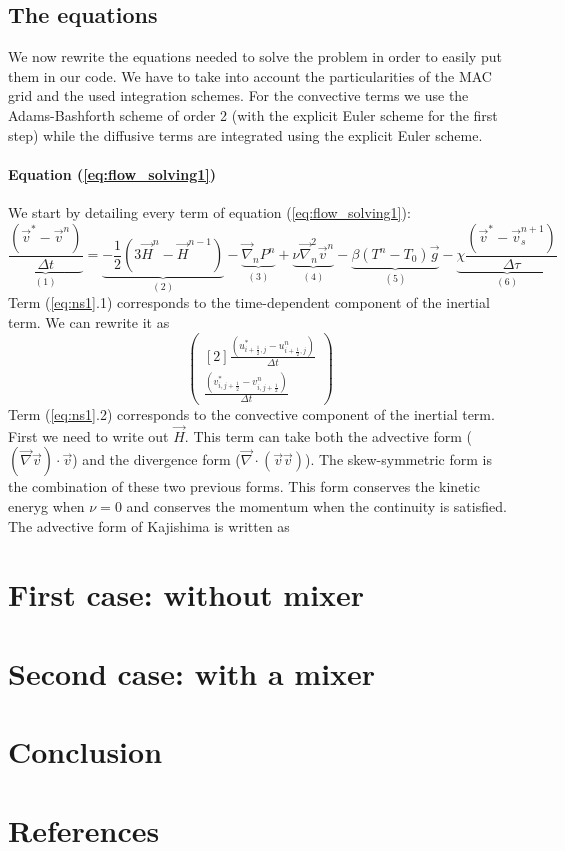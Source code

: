 \documentclass[a4paper,10pt]{scrartcl}
\newcommand\lapl{\vec{\nabla}^2}
\newcommand\grad{\vec{\nabla}}
\begin{document}
\subsection{The equations}
We now rewrite the equations needed to solve the problem in order to easily put them in our code. We have to take into account the particularities of the MAC grid and the used integration schemes. For the convective terms we use the Adams-Bashforth scheme of order 2 (with the explicit Euler scheme for the first step) while the diffusive terms are integrated using the explicit Euler scheme.
\paragraph{Equation (\ref{eq:flow_solving1})}
We start by detailing every term of equation (\ref{eq:flow_solving1}):
\begin{equation} \underbrace{\frac{(\vec{v}^*-\vec{v}^n)}{\Delta t}}_{(1)} = \underbrace{-\frac{1}{2}(3\vec{H}^n-\vec{H}^{n-1})}_{(2)} - \underbrace{\grad_nP^n}_{(3)} + \underbrace{\nu\lapl_n\vec{v}^n}_{(4)} - \underbrace{\beta(T^n-T_0)\vec{g}}_{(5)} - \underbrace{\chi\frac{(\vec{v}^*-\vec{v}_s^{n+1})}{\Delta\tau}}_{(6)} \label{eq:ns1}\end{equation}
Term (\ref{eq:ns1}.1) corresponds to the time-dependent component of the inertial term. We can rewrite it as
\begin{equation} \begin{pmatrix}[2] \frac{(u^*_{i+\frac{1}{2},j} - u^n_{i+\frac{1}{2},j})}{\Delta t} \\ \frac{(v^*_{i,j+\frac{1}{2}} - v^n_{i,j+\frac{1}{2}})}{\Delta t} \end{pmatrix} \end{equation}
Term (\ref{eq:ns1}.2) corresponds to the convective component of the inertial term. First we need to write out $\vec{H}$.  This term can take both the advective form ($(\vec{\nabla}\vec{v})\cdot\vec{v}$) and the divergence form ($\vec{\nabla}\cdot(\vec{v}\vec{v})$). The skew-symmetric form is the combination of these two previous forms. This form conserves the kinetic eneryg when $\nu=0$ and conserves the momentum when the continuity is satisfied. The advective form of Kajishima is written as
\section{First case: without mixer}
\section{Second case: with a mixer}
\section{Conclusion}
\section{References}
\printbibliography
\end{document}
